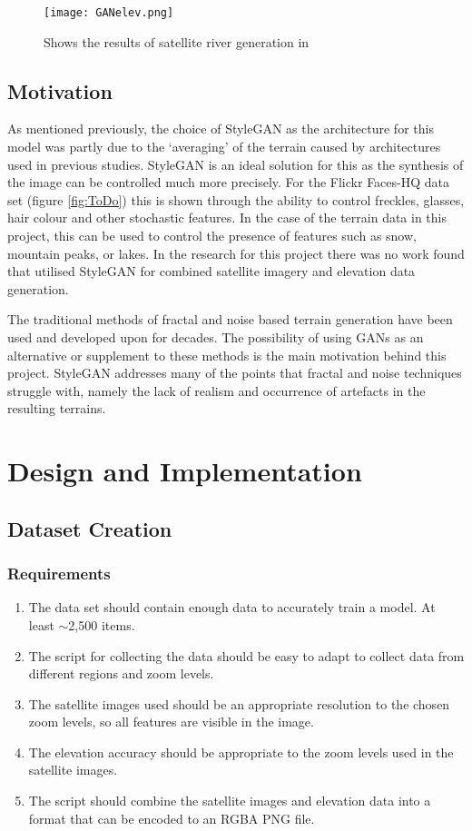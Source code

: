 \documentclass[a4paper]{report}
\begin{document}
\begin{figure}[H]
    \centering
        \texttt{[image: GANelev.png]}
        \caption{Shows the results of satellite river generation in \cite{riverSat}}
        \label{fig:elevGAN}
\end{figure}

\subsection{Motivation}
As mentioned previously, the choice of StyleGAN as the architecture for this model was partly due to the `averaging' of the terrain caused by architectures used in previous studies. StyleGAN is an ideal solution for this as the synthesis of the image can be controlled much more precisely. For the Flickr Faces-HQ data set (figure \ref{fig:ToDo}) this is shown through the ability to control freckles, glasses, hair colour and other stochastic features. In the case of the terrain data in this project, this can be used to control the presence of features such as snow, mountain peaks, or lakes. In the research for this project there was no work found that utilised StyleGAN for combined satellite imagery and elevation data generation.

The traditional methods of fractal and noise based terrain generation have been used and developed upon for decades. The possibility of using GANs as an alternative or supplement to these methods is the main motivation behind this project. StyleGAN addresses many of the points that fractal and noise techniques struggle with, namely the lack of realism and occurrence of artefacts in the resulting terrains.
\section{Design and Implementation}
\subsection{Dataset Creation}
\subsubsection{Requirements}
\begin{enumerate}
    \item The data set should contain enough data to accurately train a model. At least $\sim$2,500 items.
    \item The script for collecting the data should be easy to adapt to collect data from different regions and zoom levels.
    \item The satellite images used should be an appropriate resolution to the chosen zoom levels, so all features are visible in the image.
    \item The elevation accuracy should be appropriate to the zoom levels used in the satellite images.
    \item The script should combine the satellite images and elevation data into a format that can be encoded to an RGBA PNG file.
\end{enumerate}
\end{document}
